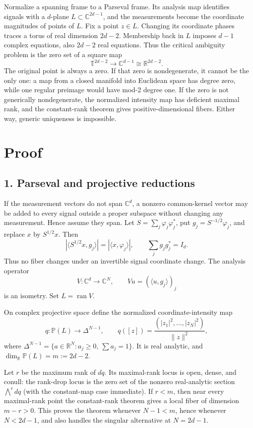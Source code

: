 \documentclass[10pt]{article}
\newcommand{\T}{\mathbb T}
\newcommand{\C}{\mathbb C}
\newcommand{\PP}{\mathbb P}
\newcommand{\ran}{\operatorname{ran}}
\begin{document}
Normalize a spanning frame to a Parseval frame.  Its analysis map identifies
signals with a \(d\)-plane \(L\subset\C^{2d-1}\), and the measurements become
the coordinate magnitudes of points of \(L\).  Fix a point \(z\in L\).
Changing its coordinate phases traces a torus of real dimension \(2d-2\).
Membership back in \(L\) imposes \(d-1\) complex equations, also \(2d-2\)
real equations.  Thus the critical ambiguity problem is the zero set of a
square map
\[
 \T^{2d-2}\longrightarrow\C^{d-1}\cong\mathbb R^{2d-2}.
\]
The original point is always a zero.  If that zero is nondegenerate, it cannot
be the only one: a map from a closed manifold into Euclidean space has degree
zero, while one regular preimage would have mod-2 degree one.  If the zero is
not generically nondegenerate, the normalized intensity map has deficient
maximal rank, and the constant-rank theorem gives positive-dimensional
fibers.  Either way, generic uniqueness is impossible.

\section*{Proof}

\subsection*{1. Parseval and projective reductions}

If the measurement vectors do not span \(\C^d\), a nonzero common-kernel
vector may be added to every signal outside a proper subspace without changing
any measurement.  Hence assume they span.  Let
\(S=\sum_j\varphi_j\varphi_j^*\), put
\(g_j=S^{-1/2}\varphi_j\), and replace \(x\) by \(S^{1/2}x\).  Then
\[
 |\langle S^{1/2}x,g_j\rangle|=|\langle x,\varphi_j\rangle|,
 \qquad \sum_j g_jg_j^*=I_d.
\]
Thus no fiber changes under an invertible signal coordinate change.  The
analysis operator
\[
 V:\C^d\to\C^N,\qquad Vu=(\langle u,g_j\rangle)_j
\]
is an isometry.  Set \(L=\ran V\).

On complex projective space define the normalized coordinate-intensity map
\[
 q:\PP(L)\longrightarrow\Delta^{N-1},\qquad
 q([z])=\frac{(|z_1|^2,\ldots,|z_N|^2)}{\|z\|^2},
\]
where \(\Delta^{N-1}=\{a\in\mathbb R^N:a_j\ge0,\ \sum a_j=1\}\).
It is real analytic, and \(\dim_{\mathbb R}\PP(L)=m:=2d-2\).

Let \(r\) be the maximum rank of \(dq\).  Its maximal-rank locus is open,
dense, and conull: the rank-drop locus is the zero set of the nonzero
real-analytic section \(\bigwedge^r dq\) (with the constant-map case
immediate).  If \(r<m\), then near every maximal-rank point the constant-rank
theorem gives a local fiber of dimension \(m-r>0\).  This proves the theorem
whenever \(N-1<m\), hence whenever \(N<2d-1\), and also handles the singular
alternative at \(N=2d-1\).
\end{document}
